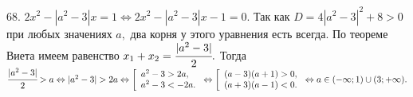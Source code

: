 68. $2x^2-|a^2-3|x=1\Leftrightarrow 2x^2-|a^2-3|x-1=0.$ Так как $D=4|a^2-3|^2+8>0$ при любых значениях $a,$ два корня у этого уравнения есть всегда. По теореме Виета имеем равенство $x_1+x_2=\cfrac{|a^2-3|}{2}.$ Тогда $\cfrac{|a^2-3|}{2}>a\Leftrightarrow |a^2-3|>2a \Leftrightarrow \left[\begin{array}{l} a^2-3>2a,\\ a^2-3<-2a.\end{array}\right.\Leftrightarrow \left[\begin{array}{l} (a-3)(a+1)>0,\\ (a+3)(a-1)<0.\end{array}\right.\Leftrightarrow a\in(-\infty;1)\cup(3;+\infty).$\\
